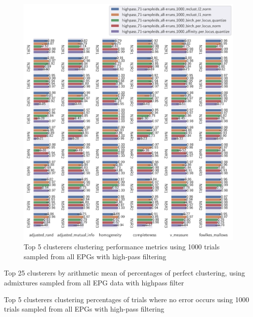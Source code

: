\begin{theappendices}
\begin{figure}[H]
\centering
\includegraphics[width=\textwidth]{./figures/clust_comparison/highpass_71-sampleids_all-nruns_1000_top_5_clusterers_by_metrics.pdf}
\caption{Top 5 clusterers clustering performance metrics using 1000 trials sampled from all EPGs with high-pass filtering}
\label{fig:highpass_71-sampleids_all-nruns_1000_top_5_clusterers_by_metrics}
\end{figure}

\begin{table}[H]
\centering
{}
\caption{Top 25 clusterers by arithmetic mean of percentages of perfect clustering, using admixtures sampled from all EPG data with highpass filter}
\label{table:top_25_not_ensemble_clusterers_by_binomial_confidence_highpass_71-sampleids_all-nruns_1000}
\end{table}

\begin{table}[H]
\centering
{}
\caption{Top 5 clusterers clustering percentages of trials where no error occurs using 1000 trials sampled from all EPGs with high-pass filtering}
\label{table:highpass_71-sampleids_all-nruns_1000_top_5_clusterers_by_binomial_confidence}
\end{table}


\end{theappendices}
